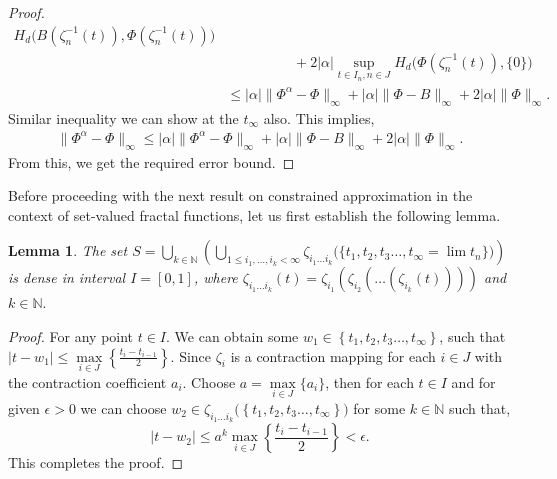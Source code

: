 \documentclass[12pt,oneside,reqno]{amsart}
\newtheorem{lemma}[theorem]{Lemma}
\theoremstyle{definition}
\theoremstyle{remark}
\begin{document}
\begin{proof}
\begin{align*}
     H_d\bigg(B\left(\zeta_n^{-1}(t)\right),\Phi\left(\zeta_n^{-1}(t)\right)\bigg)\\
     & \hspace{2cm}+2 \lvert \alpha \rvert \sup_{t \in I_n, n \in J}H_d\bigg(  \Phi\left(\zeta_n^{-1}(t)\right),\{0\}\bigg)\\
     & \leq \lvert \alpha \rvert \lVert \Phi^{\alpha}-\Phi \rVert _{\infty}+ \lvert \alpha \rvert \lVert \Phi-B \rVert _{\infty}+2 \lvert \alpha \rvert  \lVert \Phi \rVert_{\infty}.
   \end{align*}
 Similar inequality we can show at the $t_\infty$ also. This implies,
 \begin{align*}
      \lVert \Phi^{\alpha}-\Phi \rVert _{\infty}\le  \lvert \alpha \rvert \lVert \Phi^{\alpha}-\Phi \rVert _{\infty}+ \lvert \alpha \rvert \lVert \Phi-B \rVert _{\infty}+2 \lvert \alpha \rvert  \lVert \Phi \rVert_{\infty}.
 \end{align*}
From this, we get the required error bound.
 \end{proof}
Before proceeding with the next result on constrained approximation in the context of set-valued fractal functions, let us first establish the following lemma.
 
\begin{lemma}\label{lem4.6}
 The set $S=\underset{k \in \mathbb{N}}{\bigcup}\left(\underset{1\leq i_1,\ldots,i_k< \infty}{\bigcup}\zeta_{i_{1}\ldots i_{k}}\bigg(\big\{t_1,t_2,t_3\ldots,t_\infty = \lim t_n \big\}\bigg)\right)$ is dense in interval $I=[0,1]$, where $\zeta_{i_{1}\ldots i_{k}}(t)=\zeta_{i_{1}}(\zeta_{i_{2}}(\ldots (\zeta_{i_{k}}(t))))$ and $k \in \mathbb{N}.$
\end{lemma}
\begin{proof}
For any point $t \in I$. We can obtain some $w_1\in \left\{t_1,t_2,t_3 \ldots,t_\infty\right\}$, such that $\lvert t-w_1 \rvert\leq \underset{i\in J}{\max} \left\{\frac{t_i-t_{i-1}}{2}\right\}$. Since $\zeta_i$ is a contraction mapping for each $i\in J$ with the contraction coefficient $a_i$. Choose $a=\underset{i\in J}{\max} \{a_i\}$, then for each $t \in I$ and for given $\epsilon>0$ we can choose $w_2\in \zeta_{i_{1}\ldots i_{k}}\big(\left\{t_1,t_2,t_3\ldots,t_\infty\right\}\big)$ for some $k\in \mathbb{N}$ such that,
\[\lvert t-w_2 \rvert\leq a^{k}\underset{i\in J}{\max} \left\{\frac{t_i-t_{i-1}}{2}\right\}<\epsilon.\]
This completes the proof.
\end{proof}
\end{document}
